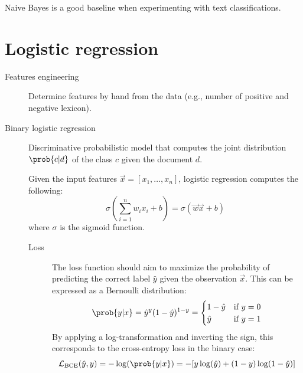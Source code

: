 \begin{remark}
    Naive Bayes is a good baseline when experimenting with text classifications.
\end{remark}



\section{Logistic regression}

\begin{description}
    \item[Features engineering] 
        Determine features by hand from the data (e.g., number of positive and negative lexicon).


    \item[Binary logistic regression] 
        Discriminative probabilistic model that computes the joint distribution $\prob{c | d}$ of the class $c$ given the document $d$.

        Given the input features $\vec{x} = [x_1, \dots, x_n]$, logistic regression computes the following:
        \[ 
            \sigma\left( \sum_{i=1}^{n} w_i x_i + b \right) = \sigma(\vec{w}\vec{x} + b)
        \]
        where $\sigma$ is the sigmoid function.

        \begin{description}
            \item[Loss]
                The loss function should aim to maximize the probability of predicting the correct label $\hat{y}$ given the observation $\vec{x}$. This can be expressed as a Bernoulli distribution:
                \[ 
                    \prob{y | x} = \hat{y}^y (1-\hat{y})^{1-y} = \begin{cases}
                        1 - \hat{y} & \text{if $y=0$} \\
                        \hat{y} & \text{if $y=1$} \\
                    \end{cases} 
                \]
                By applying a log-transformation and inverting the sign, this corresponds to the cross-entropy loss in the binary case:
                \[ \mathcal{L}_{\text{BCE}}(\hat{y}, y) = -\log(\prob{y | x}) = -[y \log(\hat{y}) + (1-y)\log(1-\hat{y})] \]


\end{description}
\end{description}
